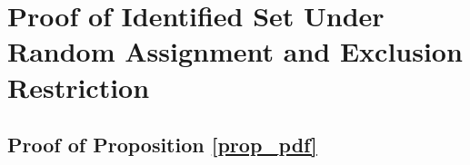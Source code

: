\documentclass[12pt]{article}
\theoremstyle{plain}
\theoremstyle{definition}
\theoremstyle{remark}
\begin{document}

\onehalfspacing

\renewcommand\refname{Reference}


\clearpage
\appendix

\section{Proof of Identified Set Under Random Assignment and Exclusion Restriction}

\subsection{Proof of Proposition \ref{prop_pdf}} \label{app:proof_prop1}   
\end{document}
